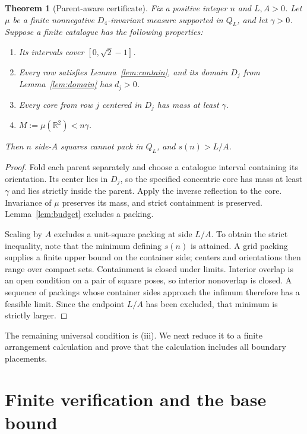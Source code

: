 \documentclass[11pt]{article}
\newtheorem{theorem}{Theorem}
\newcommand{\Q}{Q}
\newcommand{\R}{\mathbb R}
\begin{document}
\begin{theorem}[Parent-aware certificate]\label{thm:certificate}
Fix a positive integer $n$ and $L,A>0$. Let $\mu$ be a finite nonnegative
$D_4$-invariant measure supported in $\Q_L$, and let $\gamma>0$. Suppose a
finite catalogue has the following properties:
\begin{enumerate}[label=(\roman*),leftmargin=2.3em]
\item Its intervals cover $[0,\sqrt2-1]$.
\item Every row satisfies Lemma~\ref{lem:contain}, and its domain $D_j$ from
Lemma~\ref{lem:domain} has $d_j>0$.
\item Every core from row $j$ centered in $D_j$ has mass at least $\gamma$.
\item $M:=\mu(\R^2)<n\gamma$.
\end{enumerate}
Then $n$ side-$A$ squares cannot pack in $\Q_L$, and $s(n)>L/A$.
\end{theorem}

\begin{proof}
Fold each parent separately and choose a catalogue interval containing its
orientation. Its center lies in $D_j$, so the specified concentric core has
mass at least $\gamma$ and lies strictly inside the parent. Apply the inverse
reflection to the core. Invariance of $\mu$ preserves its mass, and strict
containment is preserved. Lemma~\ref{lem:budget} excludes a packing.

Scaling by $A$ excludes a unit-square packing at side $L/A$. To obtain the
strict inequality, note that the minimum defining $s(n)$ is attained. A grid
packing supplies a finite upper bound on the container side; centers and
orientations then range over compact sets. Containment is closed under limits.
Interior overlap is an open condition on a pair of square poses, so
interior nonoverlap is closed. A sequence of packings whose container sides
approach the infimum therefore has a feasible limit. Since the endpoint
$L/A$ has been excluded, that minimum is strictly larger.
\end{proof}

The remaining universal condition is (iii). We next reduce it to a finite
arrangement calculation and prove that the calculation includes all boundary
placements.

\section{Finite verification and the base bound}\label{sec:verification}
\end{document}
